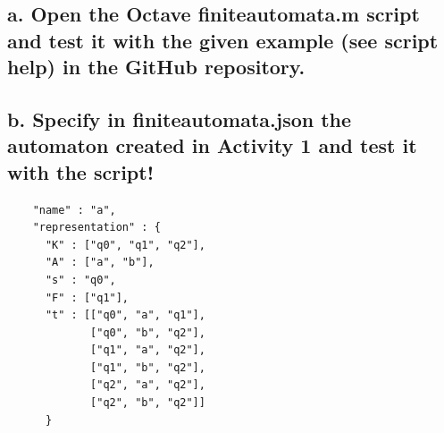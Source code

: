 \documentclass[20pt,oneside]{extbook}
\begin{document}
\subsection*{a. Open the Octave finiteautomata.m script and test it with the given
example (see script help) in the GitHub repository.\\
\\b. Specify in finiteautomata.json the automaton created in Activity 1
and test it with the script!\\}
\begin{verbatim}
    "name" : "a",
    "representation" : { 
      "K" : ["q0", "q1", "q2"],
      "A" : ["a", "b"],
      "s" : "q0",
      "F" : ["q1"],
      "t" : [["q0", "a", "q1"],
             ["q0", "b", "q2"],
             ["q1", "a", "q2"],
             ["q1", "b", "q2"],
             ["q2", "a", "q2"],
             ["q2", "b", "q2"]]
      }
\end{verbatim}
\end{document}
